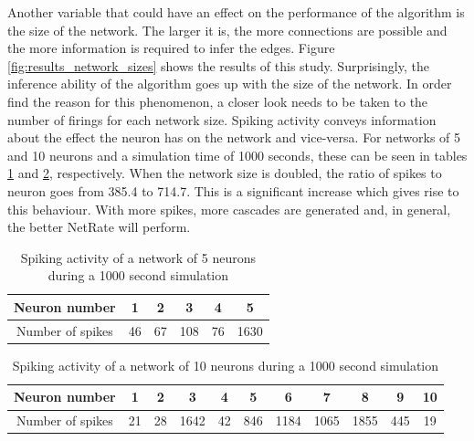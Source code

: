 Another variable that could have an effect on the performance of the algorithm is the size of the network. The larger it is, the more connections are possible and the more information is required to infer the edges. Figure \ref{fig:results_network_sizes} shows the results of this study. Surprisingly, the inference ability of the algorithm goes up with the size of the network. In order find the reason for this phenomenon, a closer look needs to be taken to the number of firings for each network size. Spiking activity conveys information about the effect the neuron has on the network and vice-versa. For networks of 5 and 10 neurons and a simulation time of 1000 seconds, these can be seen in tables \ref{tab:spiking_activity_5_neurons} and \ref{tab:spiking_activity_10_neurons}, respectively. When the network size is doubled, the ratio of spikes to neuron goes from 385.4 to 714.7. This is a significant increase which gives rise to this behaviour. With more spikes, more cascades are generated and, in general, the better NetRate will perform.\\

\begin{table}[H]
\centering
\begin{tabular}{|c|c|c|c|c|c|}
\hline
Neuron number    & 1  & 2  & 3   & 4  & 5    \\ \hline
Number of spikes & 46 & 67 & 108 & 76 & 1630 \\ \hline
\end{tabular}
\caption{Spiking activity of a network of 5 neurons during a 1000 second simulation}
\label{tab:spiking_activity_5_neurons}
\end{table}

\begin{table}[H]
\centering
\begin{tabular}{|c|c|c|c|c|c|c|c|c|c|c|}
\hline
Neuron number    & 1  & 2  & 3    & 4  & 5   & 6    & 7    & 8    & 9   & 10 \\ \hline
Number of spikes & 21 & 28 & 1642 & 42 & 846 & 1184 & 1065 & 1855 & 445 & 19 \\ \hline
\end{tabular}
\caption{Spiking activity of a network of 10 neurons during a 1000 second simulation}
\label{tab:spiking_activity_10_neurons}
\end{table}


